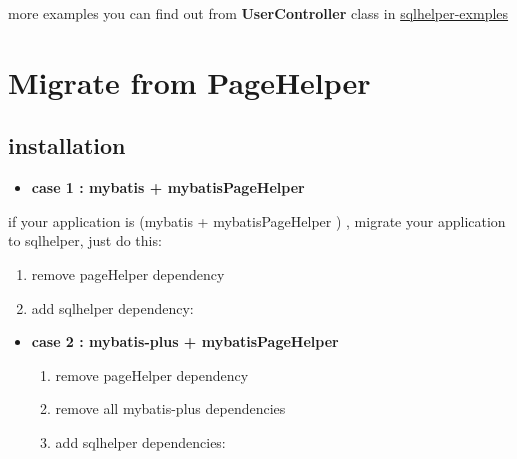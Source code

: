 \documentclass[
]{book}
\newenvironment{Shaded}{\begin{snugshade}}{\end{snugshade}}
\newcommand{\KeywordTok}[1]{\textcolor[rgb]{0.13,0.29,0.53}{\textbf{#1}}}
\newcommand{\NormalTok}[1]{#1}
\providecommand{\tightlist}{%
  \setlength{\itemsep}{0pt}\setlength{\parskip}{0pt}}
\begin{document}
more examples you can find out from \textbf{UserController} class in \href{https://github.com/fangjinuo/sqlhelper/blob/master/sqlhelper-examples/src/main/java/com/jn/sqlhelper/examples/common/controller/UserController.java}{sqlhelper-exmples}

\hypertarget{sqlhelper_mirgate_pagehelper}{%
\section{Migrate from PageHelper}\label{sqlhelper_mirgate_pagehelper}}

\hypertarget{pagination_migrate_pagehelper}{%
\subsection{installation}\label{pagination_migrate_pagehelper}}

\begin{itemize}
\tightlist
\item
  \textbf{case 1 : mybatis + mybatisPageHelper}
\end{itemize}

if your application is (mybatis + mybatisPageHelper ) , migrate your application to sqlhelper, just do this:

\begin{enumerate}
\def\labelenumi{\arabic{enumi}.}
\tightlist
\item
  remove pageHelper dependency
\item
  add sqlhelper dependency:
\end{enumerate}

\begin{Shaded}
\end{Shaded}

\begin{itemize}
\tightlist
\item
  \textbf{case 2 : mybatis-plus + mybatisPageHelper }

  \begin{enumerate}
  \def\labelenumi{\arabic{enumi}.}
  \tightlist
  \item
    remove pageHelper dependency
  \item
    remove all mybatis-plus dependencies
  \item
    add sqlhelper dependencies:
  \end{enumerate}
\end{itemize}
\end{document}
